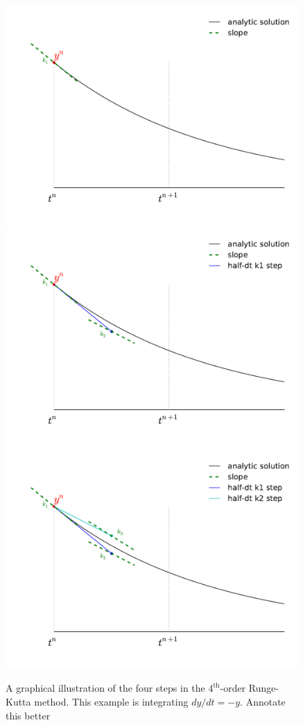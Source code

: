 \begin{figure}[t]
\centering
\includegraphics[width=0.65\linewidth]{rk4_k1} \\
\includegraphics[width=0.65\linewidth]{rk4_k2} \\
\includegraphics[width=0.65\linewidth]{rk4_k3} \\
%
\caption[The $4^\mathrm{th}$-order Runge-Kutta method] {\label{fig:rk}
  A graphical illustration of the four steps in the
  $4^\mathrm{th}$-order Runge-Kutta method.  This example
  is integrating $dy/dt = -y$.  {\color{red} Annotate this better}}
\end{figure}


